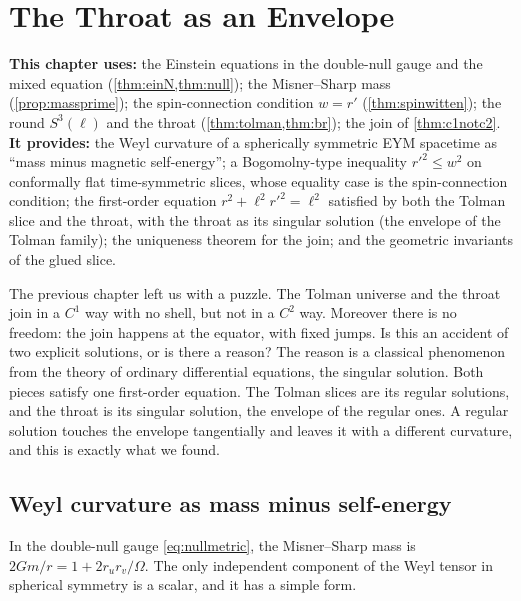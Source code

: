 \chapter{The Throat as an Envelope}
\label{ch:envelope}

\begin{usesbox}
\textbf{This chapter uses:} the Einstein equations in the double-null gauge and the mixed equation (\cref{thm:einN,thm:null}); the Misner--Sharp mass (\cref{prop:massprime}); the spin-connection condition $w=r'$ (\cref{thm:spinwitten}); the round $S^3(\ell)$ and the throat (\cref{thm:tolman,thm:br}); the join of \cref{thm:c1notc2}.\\
\textbf{It provides:} the Weyl curvature of a spherically symmetric EYM spacetime as ``mass minus magnetic self-energy''; a Bogomolny-type inequality $r'^2\le w^2$ on conformally flat time-symmetric slices, whose equality case is the spin-connection condition; the first-order equation $r^2+\ell^2r'^2=\ell^2$ satisfied by both the Tolman slice and the throat, with the throat as its singular solution (the envelope of the Tolman family); the uniqueness theorem for the join; and the geometric invariants of the glued slice.
\end{usesbox}

The previous chapter left us with a puzzle. The Tolman universe and the throat join in a $C^1$ way with no shell, but not in a $C^2$ way. Moreover there is no freedom: the join happens at the equator, with fixed jumps. Is this an accident of two explicit solutions, or is there a reason? The reason is a classical phenomenon from the theory of ordinary differential equations, the singular solution. Both pieces satisfy one first-order equation. The Tolman slices are its regular solutions, and the throat is its singular solution, the envelope of the regular ones. A regular solution touches the envelope tangentially and leaves it with a different curvature, and this is exactly what we found.

\section{Weyl curvature as mass minus self-energy}

In the double-null gauge \eqref{eq:nullmetric}, the Misner--Sharp mass is $2Gm/r=1+2r_ur_v/\Omega$. The only independent component of the Weyl tensor in spherical symmetry is a scalar, and it has a simple form.

